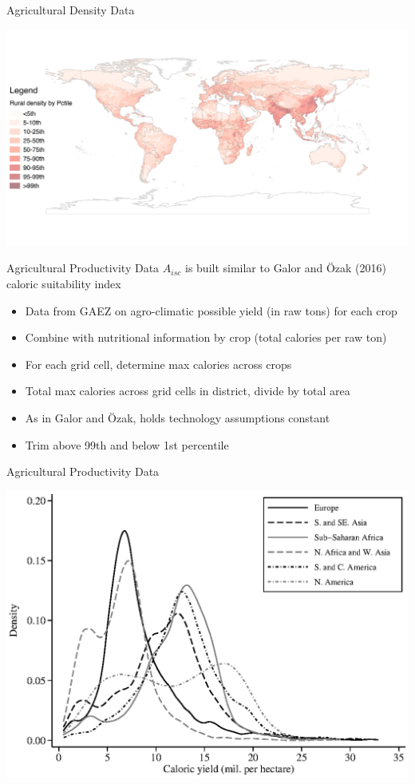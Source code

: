 \documentclass[10pt, xcolor=dvipsnames]{beamer}
\begin{document}
\begin{frame}{Agricultural Density Data}
\begin{center}
\includegraphics[scale=.5]{fig_rurd_map.png}
\end{center}
\end{frame}

\begin{frame}{Agricultural Productivity Data}\label{data}
$A_{isc}$ is built similar to Galor and {\"O}zak (2016) caloric suitability index
\begin{itemize}
  \item Data from GAEZ on agro-climatic possible yield (in raw tons) for each crop
  \item Combine with nutritional information by crop (total calories per raw ton)
  \item For each grid cell, determine max calories across crops
  \item Total max calories across grid cells in district, divide by total area
  \item As in Galor and {\"O}zak, holds technology assumptions constant
  \item Trim above 99th and below 1st percentile
\end{itemize}
\hfill \hyperlink{stats}{}

\hfill \hyperlink{crops}{}
\end{frame}

\begin{frame}{Agricultural Productivity Data}
\begin{center}
\includegraphics[width=.8\textwidth]{fig_dens_csi.eps}
\end{center}
\end{frame}
\end{document}
